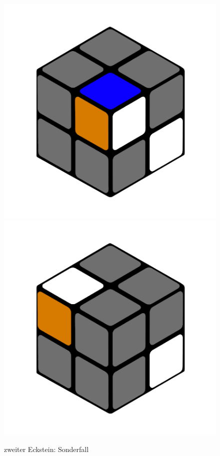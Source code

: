 \documentclass[12pt,a4paper, usenames, dvipsnames]{article}
\theoremstyle{mystyle}
\theoremstyle{definition}
\begin{document}
\begin{figure}[H]
\includegraphics[scale=0.1]{e1_s2_s3_s.png}
\includegraphics[scale=0.1]{e1_s2_s4_s.png}
\caption{zweiter Eckstein: Sonderfall}
\label{32}
\end{figure}
\end{document}
